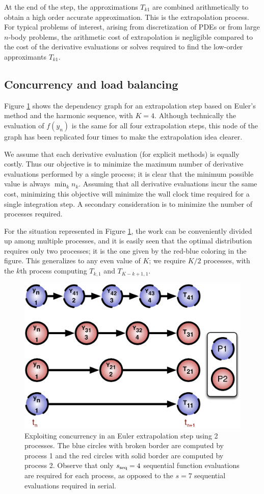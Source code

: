 \documentclass[12pt]{article}
\newcommand{\spar}{s_\textup{seq}}
\begin{document}
At the end of the step, the approximations $T_{k1}$ are combined
arithmetically to obtain a high order accurate approximation.
This is the extrapolation process.
For typical problems of interest, arising from discretization of PDEs or
from large $n$-body problems, the arithmetic cost of extrapolation is
negligible compared to the cost of the derivative evaluations or
solves required to find the low-order approximants $T_{k1}$.

\subsection{Concurrency and load balancing}
Figure \ref{fig:extrap_2proc} shows the dependency graph for an
extrapolation step based on Euler's method and the harmonic sequence, with
$K=4$.  Although technically the evaluation of $f(y_n)$ is the same
for all four extrapolation steps, this node of the graph has been
replicated four times to make the extrapolation idea clearer.

We assume that each derivative evaluation (for explicit methods)
is equally costly.  Thus
our objective is to minimize the maximum number of
derivative evaluations performed by a single process; it is clear
that the minimum possible value is always $\min_k n_k$.
Assuming that all derivative evaluations incur the same cost, minimizing
this objective will minimize the wall clock time required for a single
integration step.  A secondary consideration is to minimize the number
of processes required.

For the situation represented in Figure \ref{fig:extrap_2proc}, 
the work can be conveniently divided up among multiple processes,
and it is easily seen that the optimal distribution requires only 
two processes; it is the one given by the red-blue coloring in the figure.
This generalizes to any even value of $K$; we require $K/2$ processes, with
the $k$th process computing $T_{k,1}$ and $T_{K-k+1,1}$.

    \begin{figure}
    \begin{center}
    \includegraphics[height=0.4\textwidth]{images/extrap_2proc.pdf}
    \caption {Exploiting concurrency in an Euler extrapolation step using 2 processes.
    The blue circles with broken border are computed by process 1 and the red
    circles with solid border are computed by process 2.  Observe that only $\spar=4$
    sequential function evaluations are required for each process, as opposed to
    the $s=7$ sequential evaluations required in serial.
    \label{fig:extrap_2proc}}
    \end{center}
    \end{figure}
\end{document}
